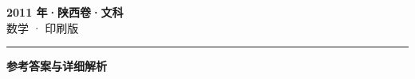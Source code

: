 \documentclass[zihao=5, a4paper]{ctexart}
\begin{document}
\begin{center}
  {\Large\bfseries 2011 年·陕西卷·文科}\\[4pt]
  {\large 数学 · 印刷版}
\end{center}
\medskip
{}

\par\bigskip\hrule\bigskip
{}
\begin{center}{\large\bfseries 参考答案与详细解析}\end{center}
\smallskip

\end{document}
